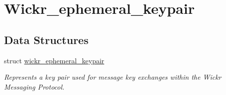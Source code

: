 \hypertarget{group__wickr__ephemeral__keypair}{}\section{Wickr\+\_\+ephemeral\+\_\+keypair}
\label{group__wickr__ephemeral__keypair}
\subsection*{Data Structures}
\begin{DoxyCompactItemize}
\item 
struct \mbox{\hyperlink{structwickr__ephemeral__keypair}{wickr\+\_\+ephemeral\+\_\+keypair}}
\begin{DoxyCompactList}\small\item\em Represents a key pair used for message key exchanges within the Wickr Messaging Protocol. \end{DoxyCompactList}\end{DoxyCompactItemize}
